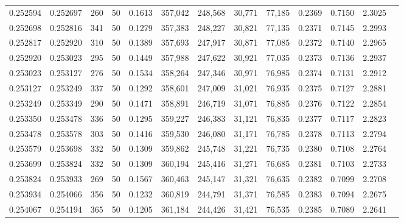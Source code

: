 \begin{tabular}{rrrrrrrrrrrrr}
0.252594 & 0.252697 &   260 &  50 &                                     0.1613 & 357,042 & 248,568 &  30,771 &  77,185 & 0.2369 & 0.7150 & 2.3025 \\
0.252698 & 0.252816 &   341 &  50 &                                     0.1279 & 357,383 & 248,227 &  30,821 &  77,135 & 0.2371 & 0.7145 & 2.2993 \\
0.252817 & 0.252920 &   310 &  50 &                                     0.1389 & 357,693 & 247,917 &  30,871 &  77,085 & 0.2372 & 0.7140 & 2.2965 \\
0.252920 & 0.253023 &   295 &  50 &                                     0.1449 & 357,988 & 247,622 &  30,921 &  77,035 & 0.2373 & 0.7136 & 2.2937 \\
0.253023 & 0.253127 &   276 &  50 &                                     0.1534 & 358,264 & 247,346 &  30,971 &  76,985 & 0.2374 & 0.7131 & 2.2912 \\
0.253127 & 0.253249 &   337 &  50 &                                     0.1292 & 358,601 & 247,009 &  31,021 &  76,935 & 0.2375 & 0.7127 & 2.2881 \\
0.253249 & 0.253349 &   290 &  50 &                                     0.1471 & 358,891 & 246,719 &  31,071 &  76,885 & 0.2376 & 0.7122 & 2.2854 \\
0.253350 & 0.253478 &   336 &  50 &                                     0.1295 & 359,227 & 246,383 &  31,121 &  76,835 & 0.2377 & 0.7117 & 2.2823 \\
0.253478 & 0.253578 &   303 &  50 &                                     0.1416 & 359,530 & 246,080 &  31,171 &  76,785 & 0.2378 & 0.7113 & 2.2794 \\
0.253579 & 0.253698 &   332 &  50 &                                     0.1309 & 359,862 & 245,748 &  31,221 &  76,735 & 0.2380 & 0.7108 & 2.2764 \\
0.253699 & 0.253824 &   332 &  50 &                                     0.1309 & 360,194 & 245,416 &  31,271 &  76,685 & 0.2381 & 0.7103 & 2.2733 \\
0.253824 & 0.253933 &   269 &  50 &                                     0.1567 & 360,463 & 245,147 &  31,321 &  76,635 & 0.2382 & 0.7099 & 2.2708 \\
0.253934 & 0.254066 &   356 &  50 &                                     0.1232 & 360,819 & 244,791 &  31,371 &  76,585 & 0.2383 & 0.7094 & 2.2675 \\
0.254067 & 0.254194 &   365 &  50 &                                     0.1205 & 361,184 & 244,426 &  31,421 &  76,535 & 0.2385 & 0.7089 & 2.2641 \\

\end{tabular}
